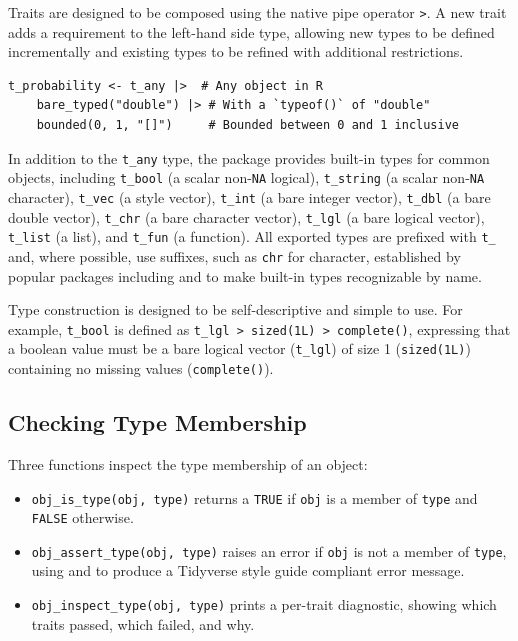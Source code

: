Traits are designed to be composed using the native pipe operator \texttt{\textbar{}\textgreater{}}. A new trait adds a requirement to the left-hand side type, allowing new types to be defined incrementally and existing types to be refined with additional restrictions.

\begin{verbatim}
t_probability <- t_any |>  # Any object in R
    bare_typed("double") |> # With a `typeof()` of "double"
    bounded(0, 1, "[]")     # Bounded between 0 and 1 inclusive
\end{verbatim}

In addition to the \texttt{t\_any} type, the package provides built-in types for common objects, including \texttt{t\_bool} (a scalar non-\texttt{NA} logical), \texttt{t\_string} (a scalar non-\texttt{NA} character), \texttt{t\_vec} (a  \citep{vctrs} style vector), \texttt{t\_int} (a bare integer vector), \texttt{t\_dbl} (a bare double vector), \texttt{t\_chr} (a bare character vector), \texttt{t\_lgl} (a bare logical vector), \texttt{t\_list} (a list), and \texttt{t\_fun} (a function). All exported types are prefixed with \texttt{t\_} and, where possible, use suffixes, such as \texttt{chr} for character, established by popular packages including  \citep{purrr} and  \citep{rlang} to make built-in types recognizable by name.

Type construction is designed to be self-descriptive and simple to use. For example, \texttt{t\_bool} is defined as \texttt{t\_lgl\ \textbar{}\textgreater{}\ sized(1L)\ \textbar{}\textgreater{}\ complete()}, expressing that a boolean value must be a bare logical vector (\texttt{t\_lgl}) of size 1 (\texttt{sized(1L)}) containing no missing values (\texttt{complete()}).

\subsection{Checking Type Membership}\label{sec-type-membership}

Three functions inspect the type membership of an object:

\begin{itemize}
\tightlist
\item
  \texttt{obj\_is\_type(obj,\ type)} returns a \texttt{TRUE} if \texttt{obj} is a member of \texttt{type} and \texttt{FALSE} otherwise.
\item
  \texttt{obj\_assert\_type(obj,\ type)} raises an error if \texttt{obj} is not a member of \texttt{type}, using  and  \citep{cli} to produce a Tidyverse style guide \citep{tidystyle2023} compliant error message.
\item
  \texttt{obj\_inspect\_type(obj,\ type)} prints a per-trait diagnostic, showing which traits passed, which failed, and why.
\end{itemize}

